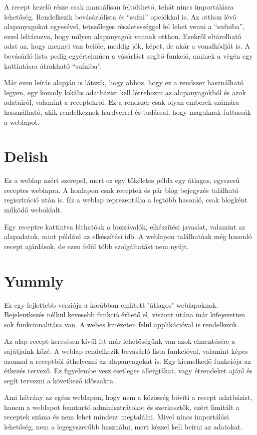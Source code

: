 \documentclass[12pt]{report}
\theoremstyle{definition}
\begin{document}
A recept kezelő része csak manuálisan feltölthető, tehát nincs importálásra lehetőség. Rendelkezik bevásárlólista és “sufni” opciókkal is. Az otthon lévő alapanyagokat egyesével, tetszőleges részletességgel fel lehet venni a “sufniba”, ezzel leltározva, hogy milyen alapanyagok vannak otthon. Ezekről eltárolható adat az, hogy mennyi van belőle, meddig jók, képet, de akár a vonalkódját is. A bevásárló lista pedig egyértelműen a vásárlást segítő funkció, aminek a végén egy kattintásra átrakható “sufniba”.

Már ezen leírás alapján is látszik, hogy ahhoz, hogy ez a rendszer használható legyen, egy komoly lokális adatbázist kell létrehozni az alapanyagokból és azok adatairól, valamint a receptekről. Ez a rendszer csak olyan emberek számára használható, akik rendelkeznek hardverrel és tudással, hogy maguknak futtassák a weblapot.
 

\section{Delish}
Ez a weblap azért szerepel, mert ez egy tökéletes példa egy átlagos, egyszerű receptes weblapra.  A honlapon csak receptek és pár blog bejegyzés található regisztráció után is. Ez a weblap reprezentálja a legtöbb hasonló, csak blogként működő weboldalt.

Egy receptre kattintva láthatóak a hozzávalók, elkészítési javaslat, valamint az alapadatok, mint például az elkészítési idő. A weblapon találhatóak még hasonló recept ajánlások, de ezen felül több szolgáltatást nem nyújt.


\section{Yummly}
Ez egy fejlettebb verziója a korábban említett "átlagos" weblapoknak. Bejelentkezés nélkül kevesebb funkció érhető el, viszont utána már kifejezetten sok funkcionalitása van. A webes kinézeten felül applikációval is rendelkezik. 

Az alap recept keresésen kívül itt már lehetőségünk van azok elmentésére a sajátjaink közé. A weblap rendelkezik bevásárló lista funkcióval, valamint képes azonnal a receptből áthelyezni az alapanyagokat is. Egy kiemelkedő funkciója az étkezés tervező. Ez figyelembe vesz esetleges allergiákat, vagy étrendeket ajánl és segít tervezni a következő időszakra. 

Ami hátrány az egész weblapon, hogy nem a közösség bővíti a recept adatbázist, hanem a weblapot fenntartó adminisztrátokot és szerkesztők, ezért limitált a receptek száma és nem lehet mindent megtalálni. Mivel nincs importálási lehetőség, nem a legegyszerűbb használni, mert kézzel kell beírni az adatokat.
\end{document}
